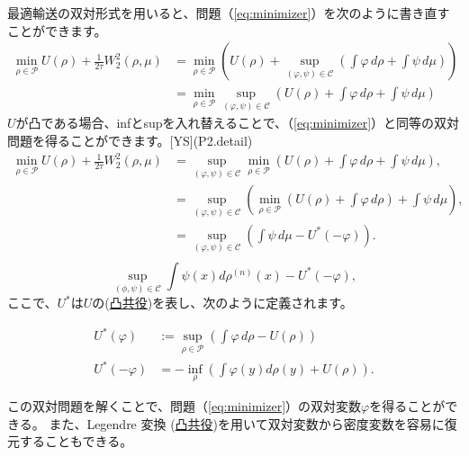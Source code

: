 \documentclass{jsarticle}
\theoremstyle{definition}
\begin{document}
{\color{teal}
最適輸送の双対形式を用いると、問題（\ref{eq:minimizer}）を次のように書き直すことができます。
}
\begin{align*}
    \min_{\rho \in \mathcal{P}} U(\rho) + \frac{1}{2\tau} W_2^2(\rho, \mu) &= \min_{\rho \in \mathcal{P}} \left(U(\rho) + \sup_{(\varphi, \psi) \in \mathcal{C}} \left(\int \varphi \, d\rho + \int \psi \, d\mu\right)\right)\\
                                                                            &= \min_{\rho \in \mathcal{P}} \sup_{(\varphi, \psi) \in \mathcal{C}} \left(U(\rho) + \int \varphi \, d\rho + \int \psi \, d\mu\right)
  \end{align*}
$U$が凸である場合、infとsupを入れ替えることで、（\ref{eq:minimizer}）と同等の双対問題を得ることができます。[YS](P2.detail)
\begin{align*}
    \min_{\rho \in \mathcal{P}} U(\rho) + \frac{1}{2\tau} W_2^2(\rho, \mu) &= \sup_{(\varphi, \psi) \in \mathcal{C}} \min_{\rho \in \mathcal{P}} \left(U(\rho) + \int \varphi \, d\rho + \int \psi \, d\mu \right),\\
                                                                            &= \sup_{(\varphi, \psi) \in \mathcal{C}} \left(\min_{\rho \in \mathcal{P}} \left(U(\rho) + \int \varphi \, d\rho\right) + \int \psi \, d\mu\right),\\
                                                                            &= \sup_{(\varphi, \psi) \in \mathcal{C}} \left(\int \psi \, d\mu - U^*(- \varphi)\right).\\
  \end{align*}
\begin{equation}
    \label{eq:dual}
    \sup_{(\phi,\psi) \in \mathcal{C}} \int \psi(x) d\rho^{(n)}(x) - U^*(- \varphi) ,
\end{equation} 
ここで、$U^*$は$U$の(\hyperlink{凸共役}{凸共役})を表し、次のように定義されます。

\begin{align*}
    U^*(\varphi) &:= \sup_{\rho \in \mathcal{P}} \left( \int \varphi \, d \rho - U(\rho)\right)\\
    U^*(- \varphi) &= - \inf_\rho \left(\int \varphi(y) d\rho(y) + U(\rho) \right).
    \end{align*}

この双対問題を解くことで、問題（\ref{eq:minimizer}）の双対変数$\varphi$を得ることができる。
また、Legendre 変換 (\hyperlink{凸共役}{凸共役})を用いて双対変数から密度変数を容易に復元することもできる。\\
\end{document}
